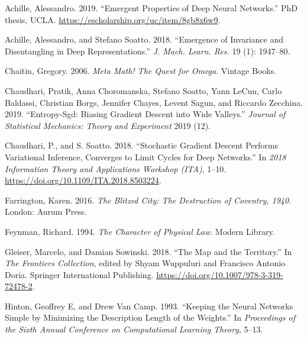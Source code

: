 \documentclass[
  letterpaper,
]{tufte-book}
\newlength{\cslhangindent}
\newlength{\cslentryspacingunit} %
\newenvironment{CSLReferences}[2] %
 {%
  \setlength{\parindent}{0pt}
  \ifodd #1
  \let\oldpar\par
  \def\par{\hangindent=\cslhangindent\oldpar}
  \fi
  \setlength{\parskip}{#2\cslentryspacingunit}
 }%
 {}
\begin{document}
\hypertarget{refs}{}
\begin{CSLReferences}{1}{0}
\leavevmode{}%
Achille, Alessandro. 2019. {``Emergent Properties of Deep Neural
Networks.''} PhD thesis, UCLA.
\url{https://escholarship.org/uc/item/8gb8x6w9}.

\leavevmode{}%
Achille, Alessandro, and Stefano Soatto. 2018. {``Emergence of
Invariance and Disentangling in Deep Representations.''} \emph{J. Mach.
Learn. Res.} 19 (1): 1947--80.

\leavevmode{}%
Chaitin, Gregory. 2006. \emph{Meta Math! The Quest for Omega}. Vintage
Books.

\leavevmode{}%
Chaudhari, Pratik, Anna Choromanska, Stefano Soatto, Yann LeCun, Carlo
Baldassi, Christian Borgs, Jennifer Chayes, Levent Sagun, and Riccardo
Zecchina. 2019. {``Entropy-Sgd: Biasing Gradient Descent into Wide
Valleys.''} \emph{Journal of Statistical Mechanics: Theory and
Experiment} 2019 (12).

\leavevmode{}%
Chaudhari, P., and S. Soatto. 2018. {``Stochastic Gradient Descent
Performs Variational Inference, Converges to Limit Cycles for Deep
Networks.''} In \emph{2018 Information Theory and Applications Workshop
(ITA)}, 1--10. \url{https://doi.org/10.1109/ITA.2018.8503224}.

\leavevmode{}%
Farrington, Karen. 2016. \emph{The Blitzed City: The Destruction of
Coventry, 1940}. London: Aurum Press.

\leavevmode{}%
Feynman, Richard. 1994. \emph{The Character of Physical Law}. Modern
Library.

\leavevmode{}%
Gleiser, Marcelo, and Damian Sowinski. 2018. {``The Map and the
Territory.''} In \emph{The Frontiers Collection}, edited by Shyam
Wuppuluri and Francisco Antonio Doria. Springer International
Publishing. \url{https://doi.org/10.1007/978-3-319-72478-2}.

\leavevmode{}%
Hinton, Geoffrey E, and Drew Van Camp. 1993. {``Keeping the Neural
Networks Simple by Minimizing the Description Length of the Weights.''}
In \emph{Proceedings of the Sixth Annual Conference on Computational
Learning Theory}, 5--13.


\end{CSLReferences}
\end{document}
